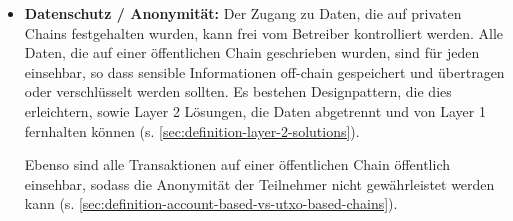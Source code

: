 \begin{itemize}
    \item \textbf{Datenschutz / Anonymität:}
    Der Zugang zu Daten, die auf privaten Chains festgehalten wurden, kann frei vom Betreiber kontrolliert werden. 
    Alle Daten, die auf einer öffentlichen Chain geschrieben wurden, sind für jeden einsehbar, so dass sensible Informationen off-chain gespeichert und übertragen  oder verschlüsselt werden sollten. 
    Es bestehen Designpattern, die dies erleichtern, sowie Layer 2 Lösungen, die Daten abgetrennt und von Layer 1 fernhalten können (s. \ref{sec:definition-layer-2-solutions}).

    Ebenso sind alle Transaktionen auf einer öffentlichen Chain öffentlich einsehbar, sodass die Anonymität der Teilnehmer nicht gewährleistet werden kann (s. \ref{sec:definition-account-based-vs-utxo-based-chains}).
\end{itemize}

